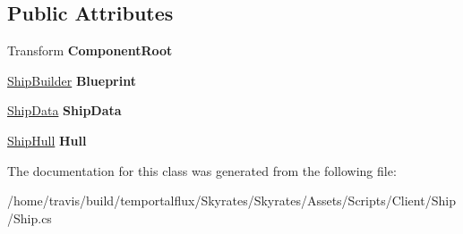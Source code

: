 \subsection*{Public Attributes}
\begin{DoxyCompactItemize}
\item 
\hypertarget{class_skyrates_1_1_client_1_1_ship_1_1_ship_a2c9f15ba4d40bfae0e0dd3c7958d4f22}{Transform {\bfseries Component\-Root}}\label{class_skyrates_1_1_client_1_1_ship_1_1_ship_a2c9f15ba4d40bfae0e0dd3c7958d4f22}

\item 
\hypertarget{class_skyrates_1_1_client_1_1_ship_1_1_ship_a698461079579d1847c9d8a4fb4688da0}{\hyperlink{class_skyrates_1_1_client_1_1_ship_1_1_ship_builder}{Ship\-Builder} {\bfseries Blueprint}}\label{class_skyrates_1_1_client_1_1_ship_1_1_ship_a698461079579d1847c9d8a4fb4688da0}

\item 
\hypertarget{class_skyrates_1_1_client_1_1_ship_1_1_ship_a34acbbe72da92209ca8a2239b5819553}{\hyperlink{class_ship_data}{Ship\-Data} {\bfseries Ship\-Data}}\label{class_skyrates_1_1_client_1_1_ship_1_1_ship_a34acbbe72da92209ca8a2239b5819553}

\item 
\hypertarget{class_skyrates_1_1_client_1_1_ship_1_1_ship_a34e93f902393de4e6afb24455d1cb7f6}{\hyperlink{class_skyrates_1_1_client_1_1_ship_1_1_ship_hull}{Ship\-Hull} {\bfseries Hull}}\label{class_skyrates_1_1_client_1_1_ship_1_1_ship_a34e93f902393de4e6afb24455d1cb7f6}

\end{DoxyCompactItemize}


The documentation for this class was generated from the following file\-:\begin{DoxyCompactItemize}
\item 
/home/travis/build/temportalflux/\-Skyrates/\-Skyrates/\-Assets/\-Scripts/\-Client/\-Ship/Ship.\-cs\end{DoxyCompactItemize}
